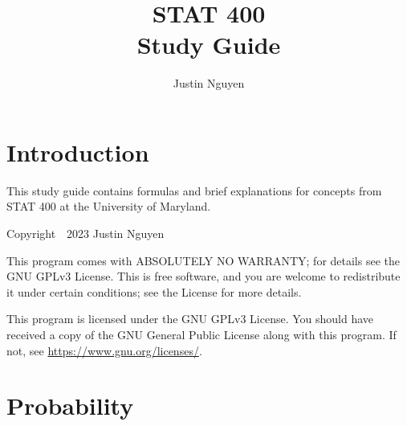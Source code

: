 \documentclass[10pt,twoside,a4paper]{article}
\newcommand{\version}{v1.0.0}
\begin{document}
\allsectionsfont{\fontsize{11}{12}\selectfont}

\title{%
	STAT 400 \\
	\large Study Guide
}
\author{Justin Nguyen}

\pagestyle{fancy}
\chead{}
\rhead{\version} 

\cfoot{} 
\rfoot{\thepage}

\begin{multicols*}{2}
	
	\begin{framed}
		\maketitle
	\end{framed}
	\thispagestyle{fancy}
	\begin{flushleft}

	\section{Introduction}
	This study guide contains formulas and brief explanations for concepts
	from STAT 400 at the University of Maryland.
	\vspace{.5cm}

	Copyright~\textcopyright~2023 Justin Nguyen
	
	This program comes with ABSOLUTELY NO WARRANTY; for details see the GNU GPLv3
	License. This is free software, and you are welcome to redistribute it under
	certain conditions; see the License for more details.

	This program is licensed under the GNU GPLv3 License. You should have 
	received a copy of the GNU General Public License along with this program.
	If not, see \href{https://www.gnu.org/licenses/}{https://www.gnu.org/licenses/}.
	

	\section{Probability}

\end{flushleft}
\end{multicols*}
\end{document}

